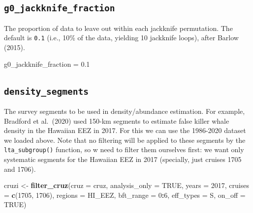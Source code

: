 \documentclass[
]{book}
\newenvironment{Shaded}{\begin{snugshade}}{\end{snugshade}}
\newcommand{\AttributeTok}[1]{\textcolor[rgb]{0.13,0.29,0.53}{#1}}
\newcommand{\ConstantTok}[1]{\textcolor[rgb]{0.56,0.35,0.01}{#1}}
\newcommand{\DecValTok}[1]{\textcolor[rgb]{0.00,0.00,0.81}{#1}}
\newcommand{\FloatTok}[1]{\textcolor[rgb]{0.00,0.00,0.81}{#1}}
\newcommand{\FunctionTok}[1]{\textcolor[rgb]{0.13,0.29,0.53}{\textbf{#1}}}
\newcommand{\NormalTok}[1]{#1}
\newcommand{\OtherTok}[1]{\textcolor[rgb]{0.56,0.35,0.01}{#1}}
\newcommand{\SpecialCharTok}[1]{\textcolor[rgb]{0.81,0.36,0.00}{\textbf{#1}}}
\newcommand{\StringTok}[1]{\textcolor[rgb]{0.31,0.60,0.02}{#1}}
\begin{document}
\hypertarget{g0_jackknife_fraction}{%
\subsection*{\texorpdfstring{\texttt{g0\_jackknife\_fraction}}{g0\_jackknife\_fraction}}\label{g0_jackknife_fraction}}

The proportion of data to leave out within each jackknife permutation. The default is \texttt{0.1} (i.e., 10\% of the data, yielding 10 jackknife loops), after Barlow (2015).

\begin{Shaded}
\begin{Highlighting}[]
\NormalTok{g0\_jackknife\_fraction }\OtherTok{=} \FloatTok{0.1}
\end{Highlighting}
\end{Shaded}

\hypertarget{density_segments}{%
\subsection*{\texorpdfstring{\texttt{density\_segments}}{density\_segments}}\label{density_segments}}

The survey segments to be used in density/abundance estimation. For example, Bradford et al.~(2020) used 150-km segments to estimate false killer whale density in the Hawaiian EEZ in 2017. For this we can use the 1986-2020 dataset we loaded above. Note that no filtering will be applied to these segments by the \texttt{lta\_subgroup()} function, so w need to filter them ourselves first: we want only systematic segments for the Hawaiian EEZ in 2017 (specially, just cruises 1705 and 1706).

\begin{Shaded}
\begin{Highlighting}[]
\NormalTok{cruzi }\OtherTok{\textless{}{-}} \FunctionTok{filter\_cruz}\NormalTok{(}\AttributeTok{cruz =}\NormalTok{ cruz,}
                      \AttributeTok{analysis\_only =} \ConstantTok{TRUE}\NormalTok{,}
                      \AttributeTok{years =} \DecValTok{2017}\NormalTok{,}
                      \AttributeTok{cruises =} \FunctionTok{c}\NormalTok{(}\DecValTok{1705}\NormalTok{, }\DecValTok{1706}\NormalTok{),}
                      \AttributeTok{regions =} \StringTok{\textquotesingle{}HI\_EEZ\textquotesingle{}}\NormalTok{,}
                      \AttributeTok{bft\_range =} \DecValTok{0}\SpecialCharTok{:}\DecValTok{6}\NormalTok{,}
                      \AttributeTok{eff\_types =} \StringTok{\textquotesingle{}S\textquotesingle{}}\NormalTok{,}
                      \AttributeTok{on\_off =} \ConstantTok{TRUE}\NormalTok{)}
\end{Highlighting}
\end{Shaded}
\end{document}
